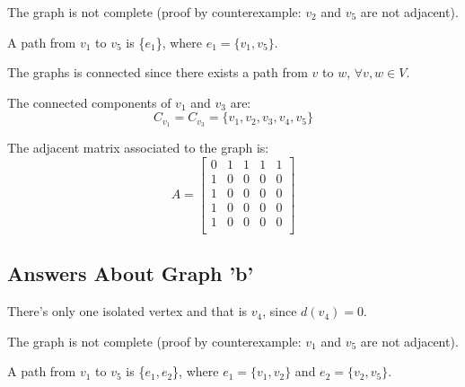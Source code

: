 \documentclass{article}
\begin{document}
    \par\noindent The graph is not complete (proof by counterexample: \(v_{2}\) and \(v_{5}\) are not adjacent).\newline
    
    \par\noindent A path from \(v_{1}\) to \(v_{5}\) is \{\(e_{1}\)\}, where \(e_{1} = \{v_{1},v_{5}\}\).\newline
    
    \par\noindent The graphs is connected since there exists a path from \(v\) to \(w\), \(\forall v,w \in V\).\newline
    
    \par\noindent The connected components of \(v_{1}\) and \(v_{3}\) are:
    \[
    C_{v_{1}} = C_{v_{3}} = \{v_{1},v_{2},v_{3},v_{4},v_{5}\}
    \]
    \newline
    
    \par\noindent The adjacent matrix associated to the graph is:
    \begin{equation*}
    A =
        \begin{bmatrix}
        0 & 1 & 1 & 1 & 1\\
        1 & 0 & 0 & 0 & 0\\
        1 & 0 & 0 & 0 & 0\\
        1 & 0 & 0 & 0 & 0\\
        1 & 0 & 0 & 0 & 0\\
        \end{bmatrix}
    \end{equation*}
    
    \subsection{Answers About Graph 'b'}
    There's only one isolated vertex and that is \(v_{4}\), since \(d(v_{4})=0\).\newline
    
    \par\noindent The graph is not complete (proof by counterexample: \(v_{1}\) and \(v_{5}\) are not adjacent).\newline
    
    \par\noindent A path from \(v_{1}\) to \(v_{5}\) is \{\(e_{1},e_{2}\)\}, where \(e_{1} = \{v_{1},v_{2}\}\) and \(e_{2} = \{v_{2},v_{5}\}\).\newline
    
\end{document}
